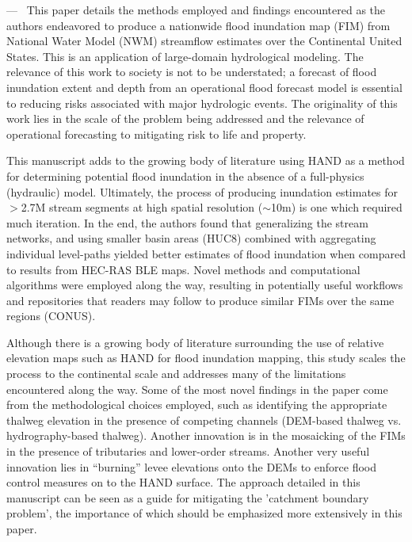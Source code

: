 \documentclass[11pt]{article}
\newcounter{reviewer}
\newcounter{point}[reviewer]
\renewcommand{\thepoint}{P\,\thereviewer.\arabic{point}}
\newenvironment{point}
   {\refstepcounter{point} \bigskip \noindent {\textbf{Reviewer~Point~\thepoint} } ---\ }
   {\par }
\begin{document}
\begin{point}
This paper details the methods employed and findings encountered as the authors endeavored to produce a nationwide flood inundation map (FIM) from National Water Model (NWM) streamflow estimates over the Continental United States.
This is an application of large-domain hydrological modeling.
The relevance of this work to society is not to be understated; a forecast of flood inundation extent and depth from an operational flood forecast model is essential to reducing risks associated with major hydrologic events.
The originality of this work lies in the scale of the problem being addressed and the relevance of operational forecasting to mitigating risk to life and property.

This manuscript adds to the growing body of literature using HAND as a method for determining potential flood inundation in the absence of a full-physics (hydraulic) model.
Ultimately, the process of producing inundation estimates for $>$2.7M stream segments at high spatial resolution ($\sim$10m) is one which required much iteration.
In the end, the authors found that generalizing the stream networks, and using smaller basin areas (HUC8) combined with aggregating individual level-paths yielded better estimates of flood inundation when compared to results from HEC-RAS BLE maps.
Novel methods and computational algorithms were employed along the way, resulting in potentially useful workflows and repositories that readers may follow to produce similar FIMs over the same regions (CONUS).

Although there is a growing body of literature surrounding the use of relative elevation maps such as HAND for flood inundation mapping, this study scales the process to the continental scale and addresses many of the limitations encountered along the way.
Some of the most novel findings in the paper come from the methodological choices employed, such as identifying the appropriate thalweg elevation in the presence of competing channels (DEM-based thalweg vs. hydrography-based thalweg).
Another innovation is in the mosaicking of the FIMs in the presence of tributaries and lower-order streams.
Another very useful innovation lies in ``burning'' levee elevations onto the DEMs to enforce flood control measures on to the HAND surface.
The approach detailed in this manuscript can be seen as a guide for mitigating the 'catchment boundary problem', the importance of which should be emphasized more extensively in this paper.
\label{pt:intro_pt_reviewer_3}
\end{point}
\end{document}
